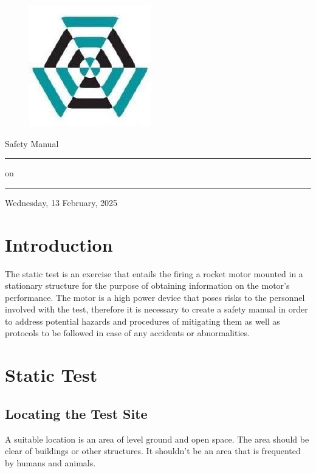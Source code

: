 \documentclass[12pt,letterpaper]{article}
\begin{document}
    \begin{center}
        \begin{figure}
            \centering
            \includegraphics[width=0.125\linewidth]{nakujalogo.jpeg}
        \end{figure}
        \huge{Safety Manual}             \\
        \rule{\textwidth}{0em}
        \large{on} 							\\
        \rule{\textwidth}{0em}
        \large{Wednesday, 13 February, 2025}
    \end{center}

    \section*{Introduction}
        \noindent The static test is an exercise that entails the firing a
        rocket motor mounted in a stationary structure for the purpose of
        obtaining information on the motor’s performance. The motor is a
        high power device that poses risks to the personnel involved with
        the test, therefore it is necessary to create a safety manual in
        order to address potential hazards and procedures of mitigating
        them as well as protocols to be followed in case of any accidents
        or abnormalities. 

    \section{Static Test}
        \subsection{Locating the Test Site}
            \noindent A suitable location is an area of level ground and
            open space. The area should be clear of buildings or other
            structures. It shouldn’t be an area that is frequented by
            humans and animals.
\end{document}
